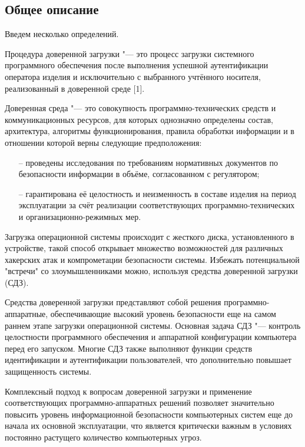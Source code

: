 \subsection{Общее описание}
Введем несколько определений.

Процедура доверенной загрузки "--- это процесс загрузки системного программного
обеспечения после выполнения успешной аутентификации оператора изделия и 
исключительно с выбранного учтённого носителя, реализованный в доверенной среде [1].

Доверенная среда "--- это совокупность программно-технических средств и 
коммуникационных ресурсов, для которых однозначно определены состав, архитектура,
алгоритмы функционирования, правила обработки информации и в отношении которой 
верны следующие предположения:
\begin{itemize}
  \item[--] проведены исследования по требованиям нормативных документов по безопасности информации в объёме, согласованном с регулятором;
  \item[--] гарантирована её целостность и неизменность в составе изделия на период эксплуатации за счёт реализации соответствующих программно-технических и организационно-режимных мер.
\end{itemize}


Загрузка операционной системы происходит с жесткого диска, установленного в 
устройстве, такой способ открывает множество возможностей для различных 
хакерских атак и компрометации безопасности системы. Избежать потенциальной "встречи" 
со злоумышленниками можно, используя средства доверенной загрузки (СДЗ).

Средства доверенной загрузки представляют собой решения программно-аппаратные, 
обеспечивающие высокий уровень безопасности еще на самом раннем этапе загрузки 
операционной системы. Основная задача СДЗ "--- контроль целостности программного 
обеспечения и аппаратной конфигурации компьютера перед его запуском. Многие СДЗ 
также выполняют функции средств идентификации и аутентификации пользователей, что 
дополнительно повышает защищенность системы.

Комплексный подход к вопросам доверенной загрузки и применение соответствующих
программно-аппаратных решений позволяет значительно повысить уровень информационной
безопасности компьютерных систем еще до начала их основной эксплуатации, что является 
критически важным в условиях постоянно растущего количество компьютерных угроз.

